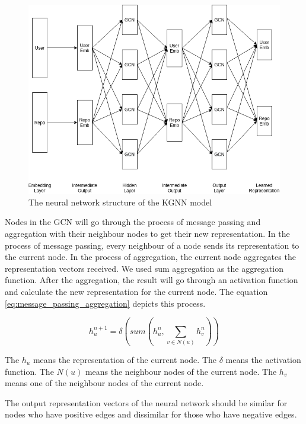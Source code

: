 \documentclass[11pt,twoside]{report}
\begin{document}
\begin{figure}[H]
    \centering
    \includegraphics[scale=0.6]{KGCN Structure.png}
    \caption{The neural network structure of the KGNN model}
    \label{fig:kgnn_structure}
\end{figure}

Nodes in the GCN will go through the process of message passing and aggregation with their neighbour nodes to get their new representation. In the process of message passing, every neighbour of a node sends its representation to the current node. In the process of aggregation, the current node aggregates the representation vectors received. We used sum aggregation as the aggregation function. After the aggregation, the result will go through an activation function and calculate the new representation for the current node. The equation \ref{eq:message_passing_aggregation} depicts this process.

\begin{equation}
    h_u^{n+1}=\delta(sum(h_u^n, \sum_{v\in{N(u)}}h_v^n))
    \label{eq:message_passing_aggregation}
\end{equation}

The $h_u$ means the representation of the current node. The $\delta$ means the activation function. The $N(u)$ means the neighbour nodes of the current node. The $h_v$ means one of the neighbour nodes of the current node.

The output representation vectors of the neural network should be similar for nodes who have positive edges and dissimilar for those who have negative edges.
\end{document}
